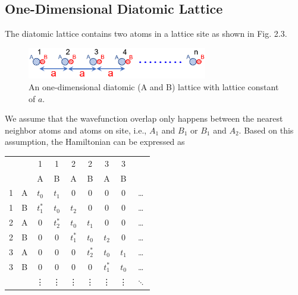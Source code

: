 \subsection{One-Dimensional Diatomic Lattice}
The diatomic lattice contains two atoms in a lattice site as shown in Fig. 2.3.
\begin{figure}[tbp]
\includegraphics[width=0.7\textwidth]{figures/Fig2_3}
\centering
\caption{\small An one-dimensional diatomic (A and B) lattice with lattice constant of $a$.}
\end{figure} We assume that the wavefunction overlap only happens between the nearest neighbor atoms and atoms on site, i.e., $A_{1}$ and $B_{1}$ or $B_{1}$ and $A_{2}$. Based on this assumption, the Hamiltonian can be expressed as\\
\begin{center}
\begin{tabular}[c]{cc|cc|cc|cc|c}
     &   & 1 & 1 & 2 & 2 & 3 & 3 &  \\
     &   & A & B & A & B & A & B &  \\
     \hline
   1 & A & $t_{0}$ & $t_{1}$ & 0 & 0 & 0 & 0 & \ldots \\
   1 & B & $t_{1}^{*}$ & $t_{0}$ & $t_{2}$ & 0 & 0 & 0 & \ldots \\
     \hline
   2 & A & 0 & $t_{2}^{*}$ & $t_{0}$ & $t_{1}$ & 0 & 0 & \ldots \\
   2 & B & 0 & 0 & $t_{1}^{*}$ & $t_{0}$ & $t_{2}$ & 0 & \ldots \\
     \hline
   3 & A & 0 & 0 & 0 & $t_{2}^{*}$ & $t_{0}$ & $t_{1}$ & \ldots \\
   3 & B & 0 & 0 & 0 & 0 & $t_{1}^{*}$ & $t_{0}$ & \ldots \\
     \hline
     & & \vdots & \vdots & \vdots & \vdots & \vdots & \vdots & $\ddots$ \\
\end{tabular}
\end{center}
